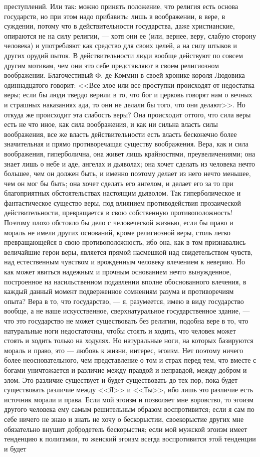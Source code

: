 \documentclass[12pt]{article}
\begin{document}
преступлений. Или так: можно принять положение, что религия есть основа государств, но при этом надо прибавить: лишь в воображении, в вере, в суждении, потому что в действительности государства, даже христианские, опираются не на силу религии, --- хотя они ее (или, вернее, веру, слабую сторону человека) и употребляют как средство для своих целей, а на силу штыков и других орудий пыток. В действительности люди вообще действуют по совсем другим мотивам, чем они это себе представляют в своем религиозном воображении. Благочестивый Ф. де-Коммин в своей хронике короля Людовика одиннадцатого говорит: <<Все злое или все проступки происходят от недостатка веры; если бы люди твердо верили в то, что бог и церковь говорят нам о вечных и страшных наказаниях ада, то они не делали бы того, что они делают>>. Но откуда же происходит эта слабость веры? Она происходит оттого, что сила веры есть не что иное, как сила воображения, и как ни сильна власть силы воображения, все же власть действительности есть власть бесконечно более значительная и прямо противоречащая существу воображения. Вера, как и сила воображения, гиперболична, она живет лишь крайностями, преувеличениями; она знает лишь о небе и аде, ангелах и дьяволах; она хочет сделать из человека нечто большее, чем он должен быть, и именно поэтому делает из него нечто меньшее, чем он мог бы быть; она хочет сделать его ангелом, и делает его за то при благоприятных обстоятельствах настоящим дьяволом. Так гиперболическое и фантастическое существо веры, под влиянием противодействия прозаической действительности, превращается в свою собственную противоположность! Поэтому плохо обстояло бы дело с человеческой жизнью, если бы право и мораль не имели других оснований, кроме религиозной веры, столь легко превращающейся в свою противоположность, ибо она, как в том признавались величайшие герои веры, является прямой насмешкой над свидетельством чувств, над естественным чувством и врожденным человеку влечением к неверию. Но как может явиться надежным и прочным основанием нечто вынужденное, построенное на насильственном подавлении вполне обоснованного влечения, в каждый данный момент подверженное сомнениям разума и противоречиям опыта? Вера в то, что государство, --- я, разумеется, имею в виду государство вообще, а не наше искусственное, сверхнатуральное государственное здание, --- что это государство не может существовать без религии, подобна вере в то, что натуральные ноги недостаточны, чтобы стоять и ходить, что человек может стоять и ходить только на ходулях. Но натуральные ноги, на которых базируются мораль и право, это --- любовь к жизни, интерес, эгоизм. Нет поэтому ничего более неосновательного, чем представление о том и страх перед тем, что вместе с богами уничтожается и различие между правдой и неправдой, между добром и злом. Это различие существует и будет существовать до тех пор, пока будет существовать различие между <<Я>> и <<Ты>>, ибо лишь это различие есть источник морали и права. Если мой эгоизм и позволяет мне воровство, то эгоизм другого человека ему самым решительным образом воспротивится; если я сам по себе ничего не знаю и знать не хочу о бескорыстии, своекорыстие других мне обязательно внушит добродетель бескорыстия; если мой мужской эгоизм имеет тенденцию к полигамии, то женский эгоизм всегда воспротивится этой тенденции и будет 
\end{document}
